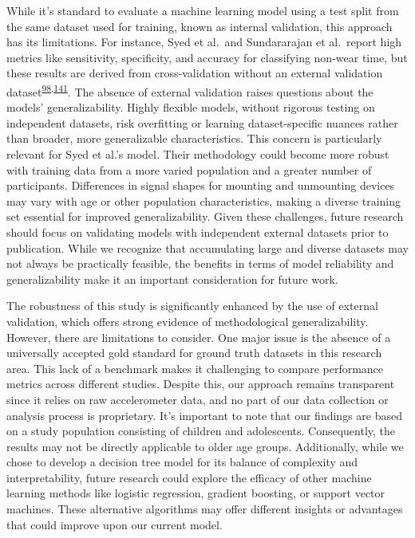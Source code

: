 \documentclass[
  10pt,
]{scrbook}
\begin{document}
While it's standard to evaluate a machine learning model using a test
split from the same dataset used for training, known as internal
validation, this approach has its limitations. For instance, Syed et
al.~and Sundararajan et al.~report high metrics like sensitivity,
specificity, and accuracy for classifying non-wear time, but these
results are derived from cross-validation without an external validation
dataset\textsuperscript{\protect\hyperlink{ref-sundararajan_sleep_2021}{98},\protect\hyperlink{ref-syed_evaluating_2020}{141}}.
The absence of external validation raises questions about the models'
generalizability. Highly flexible models, without rigorous testing on
independent datasets, risk overfitting or learning dataset-specific
nuances rather than broader, more generalizable characteristics. This
concern is particularly relevant for Syed et al.'s model. Their
methodology could become more robust with training data from a more
varied population and a greater number of participants. Differences in
signal shapes for mounting and unmounting devices may vary with age or
other population characteristics, making a diverse training set
essential for improved generalizability. Given these challenges, future
research should focus on validating models with independent external
datasets prior to publication. While we recognize that accumulating
large and diverse datasets may not always be practically feasible, the
benefits in terms of model reliability and generalizability make it an
important consideration for future work.

The robustness of this study is significantly enhanced by the use of
external validation, which offers strong evidence of methodological
generalizability. However, there are limitations to consider. One major
issue is the absence of a universally accepted gold standard for ground
truth datasets in this research area. This lack of a benchmark makes it
challenging to compare performance metrics across different studies.
Despite this, our approach remains transparent since it relies on raw
accelerometer data, and no part of our data collection or analysis
process is proprietary. It's important to note that our findings are
based on a study population consisting of children and adolescents.
Consequently, the results may not be directly applicable to older age
groups. Additionally, while we chose to develop a decision tree model
for its balance of complexity and interpretability, future research
could explore the efficacy of other machine learning methods like
logistic regression, gradient boosting, or support vector machines.
These alternative algorithms may offer different insights or advantages
that could improve upon our current model.
\end{document}
